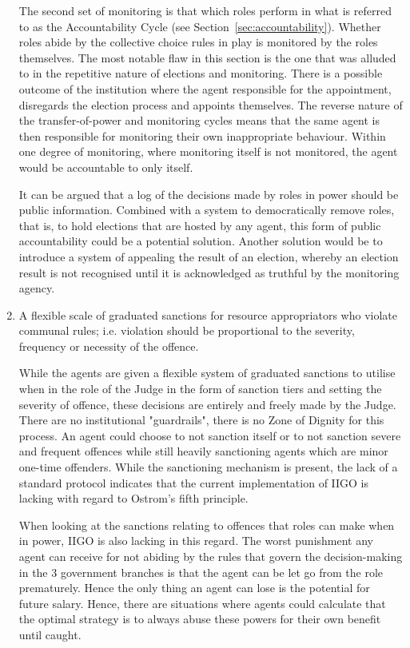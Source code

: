 \begin{enumerate}
    The second set of monitoring is that which roles perform in what is referred to as the Accountability Cycle (see Section~\ref{sec:accountability}). Whether roles abide by the collective choice rules in play is monitored by the roles themselves. The most notable flaw in this section is the one that was alluded to in the repetitive nature of elections and monitoring. There is a possible outcome of the institution where the agent responsible for the appointment, disregards the election process and appoints themselves. The reverse nature of the transfer-of-power and monitoring cycles means that the same agent is then responsible for monitoring their own inappropriate behaviour. Within one degree of monitoring, where monitoring itself is not monitored, the agent would be accountable to only itself. 

    It can be argued that a log of the decisions made by roles in power should be public information. Combined with a system to democratically remove roles, that is, to hold elections that are hosted by any agent, this form of public accountability could be a potential solution. Another solution would be to introduce a system of appealing the result of an election, whereby an election result is not recognised until it is acknowledged as truthful by the monitoring agency. 


    \item A flexible scale of graduated sanctions for resource appropriators who violate communal rules; i.e. violation should be proportional to the severity, frequency or necessity of the offence.
    
    While the agents are given a flexible system of graduated sanctions to utilise when in the role of the Judge in the form of sanction tiers and setting the severity of offence, these decisions are entirely and freely made by the Judge. There are no institutional "guardrails", there is no Zone of Dignity for this process. An agent could choose to not sanction itself or to not sanction severe and frequent offences while still heavily sanctioning agents which are minor one-time offenders. While the sanctioning mechanism is present, the lack of a standard protocol indicates that the current implementation of IIGO is lacking with regard to Ostrom's fifth principle.

    When looking at the sanctions relating to offences that roles can make when in power, IIGO is also lacking in this regard. The worst punishment any agent can receive for not abiding by the rules that govern the decision-making in the 3 government branches is that the agent can be let go from the role prematurely. Hence the only thing an agent can lose is the potential for future salary. Hence, there are situations where agents could calculate that the optimal strategy is to always abuse these powers for their own benefit until caught.


\end{enumerate}

